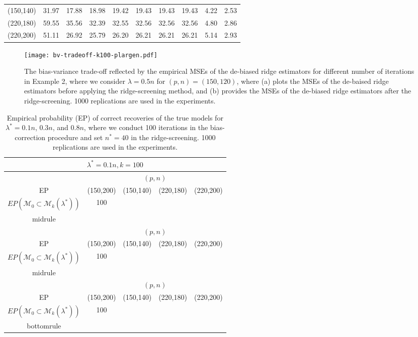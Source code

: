 {{\begin{table}[htp]
{\begin{center}
\begin{tabular}{cccccccccc}
(150,140)&31.97&17.88&18.98&19.42&19.43&19.43&19.43&4.22&2.53\\
(220,180)&59.55&35.56&32.39&32.55&32.56&32.56&32.56&4.80&2.86\\
(220,200)&51.11&26.92&25.79&26.20&26.21&26.21&26.21&5.14&2.93\\
\bottomrule
\end{tabular}
  \end{center}}
\end{table}
\begin{figure}[ht]
\begin{center}
{\texttt{[image: bv-tradeoff-k100-plargen.pdf]}}
\caption{  The bias-variance trade-off reflected by the empirical MSEs of the de-biased ridge estimators for different number of iterations in Example 2, where we consider $\lambda=0.5n$ for $(p,n)=(150,120)$, where (a) plots the MSEs of the de-baised ridge estimators  before applying the ridge-screening method, and (b) provides the MSEs of the de-biased  ridge estimators after the ridge-screening.  1000 replications are used in the experiments.  }\label{fig-20}
\end{center}
\end{figure}

\begin{table}[htp]\footnotesize
\caption{Empirical probability (EP) of correct recoveries of the true models for $\lambda^*=0.1n$, $0.3n$, and $0.8n$, where we conduct 100 iterations in the bias-correction procedure and set $n^*=40$ in the ridge-screening. 1000 replications are used in the experiments.} 
          \label{Table-a30}
{\begin{center}
\begin{tabular}{ccccc}
\toprule
\multicolumn{5}{c}{$\lambda^*=0.1n,k=100$}\\
\hline
&\multicolumn{4}{c}{$(p,n)$}\\
\cline{2-5}
EP&(150,200)&(150,140)&(220,180)&(220,200)\\
\hline
$EP(\mathcal{M}_0\subset \mathcal{M}_{k}(\lambda^*))$&100\\midrule
\multicolumn{5}{c}{$\lambda^*=0.3n,k=100$}\\
\hline
&\multicolumn{4}{c}{$(p,n)$}\\
\cline{2-5}
EP&(150,200)&(150,140)&(220,180)&(220,200)\\
\hline
$EP(\mathcal{M}_0\subset \mathcal{M}_{k}(\lambda^*))$&100\\midrule
\multicolumn{5}{c}{$\lambda^*=0.8n,k=100$}\\
\hline
&\multicolumn{4}{c}{$(p,n)$}\\
\cline{2-5}
EP&(150,200)&(150,140)&(220,180)&(220,200)\\
\hline
$EP(\mathcal{M}_0\subset \mathcal{M}_{k}(\lambda^*))$&100\\bottomrule
\end{tabular}
  \end{center}}
\end{table}


}}
